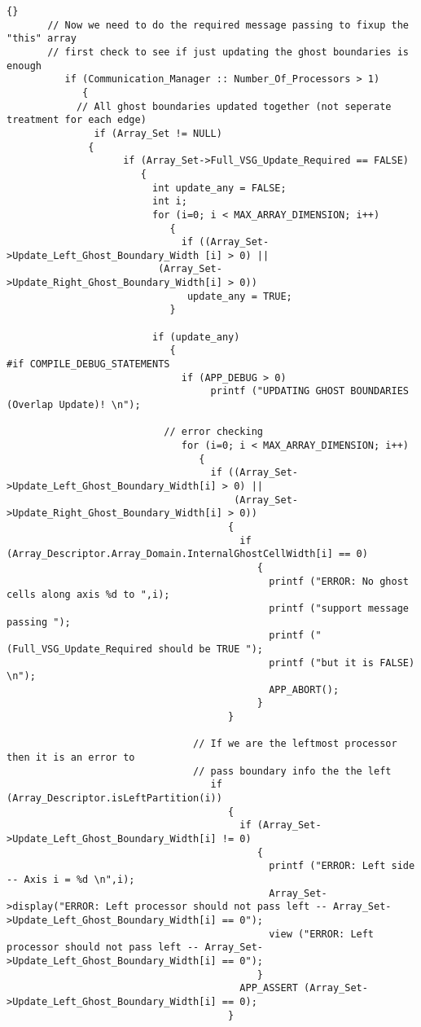 \documentclass[10pt]{llncs}
\begin{document}
\begin{lstlisting}{}
       // Now we need to do the required message passing to fixup the "this" array
       // first check to see if just updating the ghost boundaries is enough
          if (Communication_Manager :: Number_Of_Processors > 1)
             {
            // All ghost boundaries updated together (not seperate treatment for each edge)
               if (Array_Set != NULL)
	          {
                    if (Array_Set->Full_VSG_Update_Required == FALSE)
                       {
                         int update_any = FALSE;
                         int i;
                         for (i=0; i < MAX_ARRAY_DIMENSION; i++)
                            {
                              if ((Array_Set->Update_Left_Ghost_Boundary_Width [i] > 0) || 
		                  (Array_Set->Update_Right_Ghost_Boundary_Width[i] > 0)) 
	                           update_any = TRUE;		 
                            }

                         if (update_any)
                            {
#if COMPILE_DEBUG_STATEMENTS
                              if (APP_DEBUG > 0)
                                   printf ("UPDATING GHOST BOUNDARIES (Overlap Update)! \n");

                           // error checking
                              for (i=0; i < MAX_ARRAY_DIMENSION; i++)
                                 {
                                   if ((Array_Set->Update_Left_Ghost_Boundary_Width[i] > 0) || 
                                       (Array_Set->Update_Right_Ghost_Boundary_Width[i] > 0))
                                      {
                                        if (Array_Descriptor.Array_Domain.InternalGhostCellWidth[i] == 0)
                                           {
                                             printf ("ERROR: No ghost cells along axis %d to ",i);
                                             printf ("support message passing ");
                                             printf ("(Full_VSG_Update_Required should be TRUE ");
                                             printf ("but it is FALSE) \n");
                                             APP_ABORT();
                                           }
                                      }

                                // If we are the leftmost processor then it is an error to 
                                // pass boundary info the the left
                                   if (Array_Descriptor.isLeftPartition(i))
                                      {
                                        if (Array_Set->Update_Left_Ghost_Boundary_Width[i] != 0)
                                           {
                                             printf ("ERROR: Left side -- Axis i = %d \n",i);
                                             Array_Set->display("ERROR: Left processor should not pass left -- Array_Set->Update_Left_Ghost_Boundary_Width[i] == 0");
                                             view ("ERROR: Left processor should not pass left -- Array_Set->Update_Left_Ghost_Boundary_Width[i] == 0");
                                           }
                                        APP_ASSERT (Array_Set->Update_Left_Ghost_Boundary_Width[i] == 0);
                                      }


\end{lstlisting}
\end{document}
